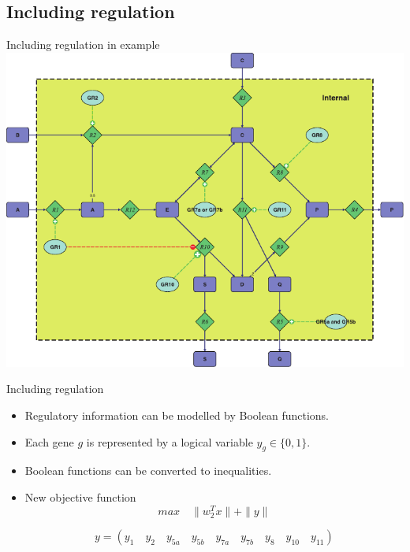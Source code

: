 \documentclass{beamer}
\begin{document}
\subsection{Including regulation}
\begin{frame}{Including regulation in example}
    \includegraphics[width=.9\textwidth]{grafik/fig1} \\
\end{frame}


\begin{frame}{Including regulation}
\begin{itemize}
    \item Regulatory information can be modelled by Boolean functions.
    \item Each gene $g$ is represented by a logical variable $y_{g} \in \{0,1\}$.
    \item Boolean functions can be converted to inequalities.
    \item New objective function 
    $$max \quad \|w_{2}^{T} x \| + \|y\| $$
    \begin{example}
        $$ y =  (y_{1} \quad y_{2} \quad y_{5a} \quad y_{5b} \quad y_{7a} \quad y_{7b} \quad y_{8} \quad y_{10} \quad y_{11})$$
    \end{example}
\end{itemize}

\end{frame}
\end{document}
